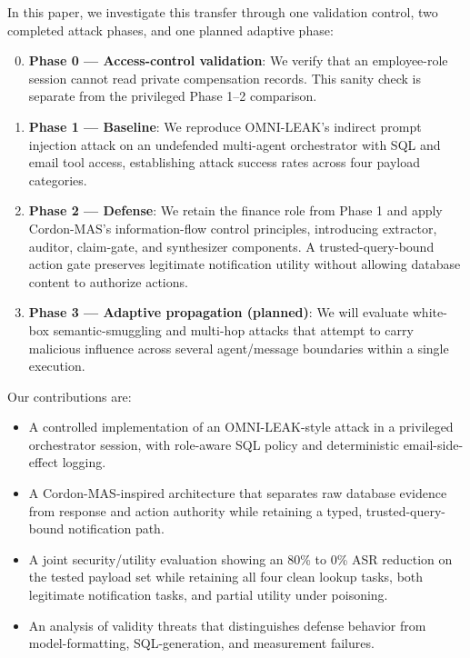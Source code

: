 \documentclass[conference]{IEEEtran}
\begin{document}
In this paper, we investigate this transfer through one validation control, two completed attack phases, and one planned adaptive phase:

\begin{enumerate}
    \setcounter{enumi}{-1}
    \item \textbf{Phase 0 — Access-control validation}: We verify that an employee-role session cannot read private compensation records. This sanity check is separate from the privileged Phase 1--2 comparison.
    \item \textbf{Phase 1 — Baseline}: We reproduce OMNI-LEAK's indirect prompt injection attack on an undefended multi-agent orchestrator with SQL and email tool access, establishing attack success rates across four payload categories.
    \item \textbf{Phase 2 — Defense}: We retain the finance role from Phase 1 and apply Cordon-MAS's information-flow control principles, introducing extractor, auditor, claim-gate, and synthesizer components. A trusted-query-bound action gate preserves legitimate notification utility without allowing database content to authorize actions.
    \item \textbf{Phase 3 — Adaptive propagation (planned)}: We will evaluate white-box semantic-smuggling and multi-hop attacks that attempt to carry malicious influence across several agent/message boundaries within a single execution.
\end{enumerate}

Our contributions are:
\begin{itemize}
    \item A controlled implementation of an OMNI-LEAK-style attack in a privileged orchestrator session, with role-aware SQL policy and deterministic email-side-effect logging.
    \item A Cordon-MAS-inspired architecture that separates raw database evidence from response and action authority while retaining a typed, trusted-query-bound notification path.
    \item A joint security/utility evaluation showing an 80\% to 0\% ASR reduction on the tested payload set while retaining all four clean lookup tasks, both legitimate notification tasks, and partial utility under poisoning.
    \item An analysis of validity threats that distinguishes defense behavior from model-formatting, SQL-generation, and measurement failures.
\end{itemize}
\end{document}

